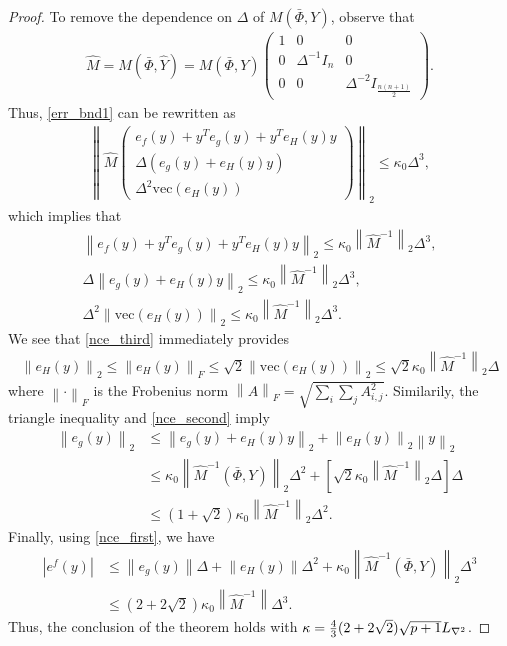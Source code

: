 \documentclass{article}
\newcommand{\matvec}{\mathrm{vec}}
\begin{document}
\begin{proof}
To remove the dependence on $\Delta$ of $M(\bar \Phi,Y)$,  observe that 
\begin{align}
\hat{M}  = M\left(\bar \Phi,  \hat{Y}\right) = M\left(\bar \Phi,Y\right) \begin{pmatrix}
1 & 0 & 0 \\
0 & \Delta^{-1} I_n & 0 \\
0 & 0 & \Delta^{-2} I_{\frac{n(n+1)}{2}}
\end{pmatrix}. \label{nce_scale}
\end{align}
Thus, \cref{err_bnd1} can be rewritten as
\begin{align*}
\left\|\hat{M}
\begin{pmatrix}
e_f(y) + y^Te_g(y) + y^Te_H(y) y \\
\Delta\left(e_g(y) + e_H(y) y\right) \\
\Delta^2 \matvec\left(e_H(y)\right)
\end{pmatrix} \right\|_2
\le \kappa_0 \Delta^3,
\end{align*}
which implies that  
\begin{align}
\left\|e_f(y) + y^Te_g(y) + y^Te_H(y) y \right\|_2\le \kappa_0 \left\|\hat M^{-1}\right\|_2 \Delta^3, \label{nce_first}\\
\Delta \left\|e_g(y) + e_H(y) y \right\|_2 \le \kappa_0 \left\|\hat M^{-1} \right\|_2  \Delta^3, \label{nce_second} \\
\Delta^2 \left\|\matvec\left(e_H(y)\right)\right\|_2 \le \kappa_0 \left\|\hat M^{-1} \right\|_2  \Delta^3. \label{nce_third}
\end{align}
We see that \cref{nce_third} immediately provides
\begin{align*}
\left\|e_H(y)\right\|_2 
\le \left\|e_H(y)\right\|_F 
\le \sqrt{2} \left\|\matvec\left(e_H(y)\right)\right\|_2
\le \sqrt{2}\kappa_0 \left\|\hat M^{-1} \right\|_2 \Delta
\end{align*}
where $\left\|\cdot\right\|_F$ is the Frobenius norm $\left\|A\right\|_F = \sqrt{\sum_i\sum_jA_{i, j}^2}$.
Similarily, the triangle inequality and \cref{nce_second} imply
\begin{align*}
\left\|e_g\left(y\right)\right\|_2 &\le \left\|e_g(y) + e_H(y) y \right\|_2 + \left\|e_H\left(y\right)\right\|_2\left\| y\right\|_2 \\
&\le \kappa_0 \left\|\hat M^{-1}(\bar \Phi, Y) \right\|_2 \Delta^2
+ \left[\sqrt{2}\kappa_0 \left\|\hat M^{-1} \right\|_2 \Delta\right]
\Delta \\
&\le\left(1 + \sqrt 2\right)\kappa_0\left\|\hat M^{-1} \right\|_2 \Delta^2.
\end{align*}
Finally, using \cref{nce_first}, we have
\begin{align*}
\left|e^f\left(y\right)\right| &\le \left\|e_g(y)\right\| \Delta + \left\|e_H(y)\right\|\Delta^2
+ \kappa_0 \left\|\hat M^{-1}(\bar \Phi, Y) \right\|_2 \Delta^3 \\
& \le \left(2 +2 \sqrt 2\right)\kappa_0 \left\|\hat M^{-1} \right\|\Delta^3.
\end{align*}
Thus, the conclusion of the theorem holds with $\kappa = \frac{4}{3}(2+2\sqrt{2})\sqrt{p+1} {L_{\nabla^2}}$.

\end{proof}
\end{document}
